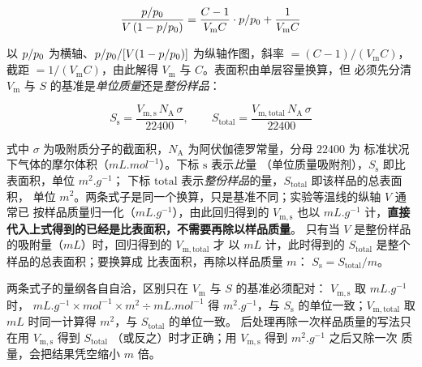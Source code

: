 \begin{equation}\label{eq:bet-lin}
\frac{p/p_{0}}{V\left(1-p/p_{0}\right)}
=\frac{C-1}{V_{\mathrm{m}}C}\cdot p/p_{0}+\frac{1}{V_{\mathrm{m}}C}
\end{equation}

以 $p/p_{0}$ 为横轴、$p/p_{0}/[V(1-p/p_{0})]$ 为纵轴作图，斜率 $=(C-1)/(V_{\mathrm{m}}C)$，
截距 $=1/(V_{\mathrm{m}}C)$，由此解得 $V_{\mathrm{m}}$ 与 $C$。表面积由单层容量换算，但
必须先分清 $V_{\mathrm{m}}$ 与 $S$ 的基准是\emph{单位质量}还是\emph{整份样品}：

\begin{equation}\label{eq:surface}
S_{\mathrm{s}}=\frac{V_{\mathrm{m,s}}\,N_{\mathrm{A}}\,\sigma}{22400},
\qquad
S_{\mathrm{total}}=\frac{V_{\mathrm{m,total}}\,N_{\mathrm{A}}\,\sigma}{22400}
\end{equation}

式中 $\sigma$ 为吸附质分子的截面积，$N_{\mathrm{A}}$ 为阿伏伽德罗常量，分母 $22400$ 为
标准状况下气体的摩尔体积（$\unit{mL.mol^{-1}}$）。下标 $\mathrm{s}$ 表示\emph{比}量
（单位质量吸附剂），$S_{\mathrm{s}}$ 即比表面积，单位 $\unit{m^2.g^{-1}}$；
下标 $\mathrm{total}$ 表示\emph{整份样品}的量，$S_{\mathrm{total}}$ 即该样品的总表面积，
单位 $\unit{m^2}$。两条式子是同一个换算，只是基准不同；实验等温线的纵轴 $V$ 通常已
按样品质量归一化（$\unit{mL.g^{-1}}$），由此回归得到的 $V_{\mathrm{m,s}}$ 也以
$\unit{mL.g^{-1}}$ 计，\textbf{直接代入上式得到的已经是比表面积，不需要再除以样品质量}。
只有当 $V$ 是整份样品的吸附量（$\unit{mL}$）时，回归得到的 $V_{\mathrm{m,total}}$ 才
以 $\unit{mL}$ 计，此时得到的 $S_{\mathrm{total}}$ 是整个样品的总表面积；要换算成
比表面积，再除以样品质量 $m$：
$S_{\mathrm{s}}=S_{\mathrm{total}}/m$。

两条式子的量纲各自自洽，区别只在 $V_{\mathrm{m}}$ 与 $S$ 的基准必须配对：
$V_{\mathrm{m,s}}$ 取 $\unit{mL.g^{-1}}$ 时，
$\unit{mL.g^{-1}}\times\unit{mol^{-1}}\times\unit{m^2}\div\unit{mL.mol^{-1}}$
得 $\unit{m^2.g^{-1}}$，与 $S_{\mathrm{s}}$ 的单位一致；$V_{\mathrm{m,total}}$ 取
$\unit{mL}$ 时同一计算得 $\unit{m^2}$，与 $S_{\mathrm{total}}$ 的单位一致。
后处理再除一次样品质量的写法只在用 $V_{\mathrm{m,s}}$ 得到 $S_{\mathrm{total}}$
（或反之）时才正确；用 $V_{\mathrm{m,s}}$ 得到 $\unit{m^2.g^{-1}}$ 之后又除一次
质量，会把结果凭空缩小 $m$ 倍。

